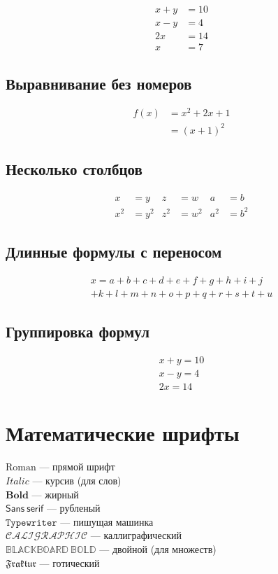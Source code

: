 \documentclass[a4paper,12pt]{article}
\begin{document}
\begin{align}
x + y &= 10 \\
x - y &= 4 \\
2x &= 14 \\
x &= 7
\end{align}

\subsection{Выравнивание без номеров}

\begin{align*}
f(x) &= x^2 + 2x + 1 \\
     &= (x + 1)^2
\end{align*}

\subsection{Несколько столбцов}

\begin{align*}
x &= y & z &= w & a &= b \\
x^2 &= y^2 & z^2 &= w^2 & a^2 &= b^2
\end{align*}

\subsection{Длинные формулы с переносом}

\begin{multline}
x = a + b + c + d + e + f + g + h + i + j \\
+ k + l + m + n + o + p + q + r + s + t + u
\end{multline}

\subsection{Группировка формул}

\begin{gather}
x + y = 10 \\
x - y = 4 \\
2x = 14
\end{gather}

\section{Математические шрифты}

$\mathrm{Roman}$ — прямой шрифт \\
$\mathit{Italic}$ — курсив (для слов) \\
$\mathbf{Bold}$ — жирный \\
$\mathsf{Sans\ serif}$ — рубленый \\
$\mathtt{Typewriter}$ — пишущая машинка \\
$\mathcal{CALIGRAPHIC}$ — каллиграфический \\
$\mathbb{BLACKBOARD\ BOLD}$ — двойной (для множеств) \\
$\mathfrak{Fraktur}$ — готический
\end{document}
